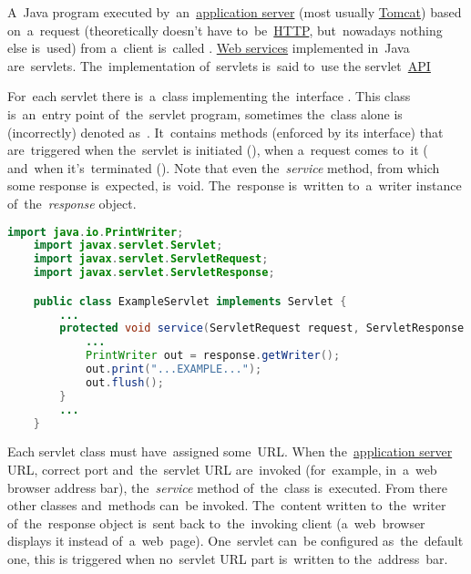 \label{servlet}
A~Java program executed by~an~\hyperref[applicationserver]{application server} (most usually \hyperref[tomcat]{Tomcat}) based on~a~request (theoretically doesn't have to~be~\hyperref[http]{HTTP}, but~nowadays nothing else is~used) from a~client is~called .
\hyperref[webserviceapplication]{Web services} implemented in~Java are~servlets.
The~implementation of~servlets is~said to~use the servlet~\hyperref[api]{API}

For~each servlet there is~a~class implementing the~interface .
This class is~an~entry point of~the~servlet program, sometimes the~class alone is (incorrectly) denoted as~.
It~contains methods (enforced by its interface) that are~triggered when the~servlet is initiated (), when a~request comes to~it ( and~when it's~terminated ().
Note that even the~\textit{service} method, from which some response is~expected, is~void.
The~response is~written to~a~writer instance of~the~\textit{response} object.

\enlargethispage{10mm}
\example
\begin{lstlisting}[language=Java]
    import java.io.PrintWriter;
    import javax.servlet.Servlet;
    import javax.servlet.ServletRequest;
    import javax.servlet.ServletResponse;

    public class ExampleServlet implements Servlet {
        ...
        protected void service(ServletRequest request, ServletResponse response) {
            ...
            PrintWriter out = response.getWriter();
            out.print("...EXAMPLE...");
            out.flush();
        }
        ...
    }
\end{lstlisting}

Each servlet class must have~assigned some~URL\@.
When the~\hyperref[applicationserver]{application server} URL, correct port and~the~servlet URL are~invoked (for~example, in~a~web browser address bar), the~\textit{service} method of~the~class is~executed.
From there other classes and~methods can~be invoked.
The~content written to~the~writer of~the~response object is~sent back to~the~invoking client (a~web~browser displays it instead of~a~web~page).
One~servlet can~be configured as~the~default one, this is triggered when no~servlet URL part is~written to the~address~bar.

